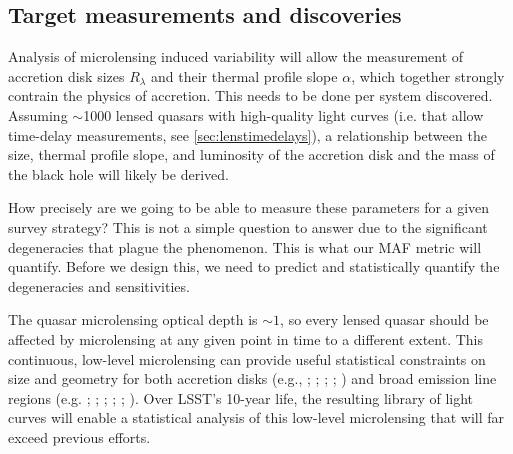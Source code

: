 \subsection{Target measurements and discoveries}
\label{sec:\secname:targets}

Analysis of microlensing induced variability will allow the measurement of
accretion disk sizes $R_\lambda$ and their thermal profile slope $\alpha$,
which together strongly contrain the physics of accretion.
This needs to be done per system discovered. Assuming $\sim$1000 lensed quasars with
high-quality light curves (i.e. that allow time-delay measurements, see
\autoref{sec:lenstimedelays}), a relationship between the size, thermal profile
slope, and luminosity of the accretion disk and the mass of the black hole
will likely be derived.

How precisely are we going to be able to measure these parameters for a given
survey strategy? This is not a simple question to answer due to the significant
degeneracies that plague the phenomenon. This is what our MAF metric will
quantify. Before we design this, we need to predict and statistically quantify
the degeneracies and sensitivities.


The quasar microlensing optical depth is $\sim1$, so every lensed quasar should
be affected by microlensing at any given point in time to a different extent.
This continuous, low-level microlensing can provide useful statistical constraints on
size and geometry for both accretion disks (e.g., \citealt{kochanek2004}; \citealt{bate2008}; \citealt{floyd2009}; \citealt{blackburne2011,blackburne2014}; \citealt{jimenez2014}) and
broad emission line regions  (e.g. \citealt{kochanek2004}; \citealt{richards2004}; \citealt{wayth2005}; \citealt{sluse2011}; \citealt{odowd2011}; \citealt{guerras2013}). Over LSST's 10-year life,
the resulting library of light curves will enable a statistical analysis of this
low-level microlensing that will far exceed previous efforts.

